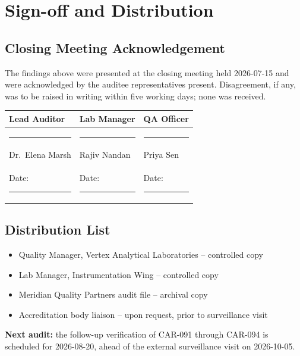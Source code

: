 \section{Sign-off and Distribution}

\subsection{Closing Meeting Acknowledgement}
The findings above were presented at the closing meeting held 2026-07-15 and were
acknowledged by the auditee representatives present. Disagreement, if any, was to be
raised in writing within five working days; none was received.

\begin{center}
\renewcommand{\arraystretch}{2.1}
\begin{tabular}{@{}p{4.6cm}p{4.6cm}p{4.6cm}@{}}
\toprule
\textbf{Lead Auditor} & \textbf{Lab Manager} & \textbf{QA Officer} \\
\midrule
\rule{4.2cm}{0.4pt} & \rule{4.2cm}{0.4pt} & \rule{4.2cm}{0.4pt} \\
Dr.\ Elena Marsh & Rajiv Nandan & Priya Sen \\
Date: \rule{2.4cm}{0.4pt} & Date: \rule{2.4cm}{0.4pt} & Date: \rule{2.4cm}{0.4pt} \\
\bottomrule
\end{tabular}
\end{center}

\subsection{Distribution List}
\begin{itemize}
  \item Quality Manager, Vertex Analytical Laboratories -- controlled copy
  \item Lab Manager, Instrumentation Wing -- controlled copy
  \item Meridian Quality Partners audit file -- archival copy
  \item Accreditation body liaison -- upon request, prior to surveillance visit
\end{itemize}

\begin{sectionbrief}
\textbf{Next audit:} the follow-up verification of CAR-091 through CAR-094 is scheduled
for 2026-08-20, ahead of the external surveillance visit on 2026-10-05.
\end{sectionbrief}
